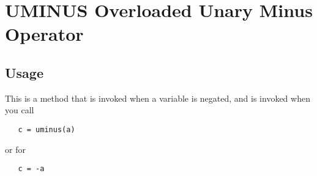 \section{UMINUS Overloaded Unary Minus Operator}

\subsection{Usage}

This is a method that is invoked when a variable is negated,
and is invoked when you call
\begin{verbatim}
   c = uminus(a)
\end{verbatim}
or for 
\begin{verbatim}
   c = -a
\end{verbatim}
